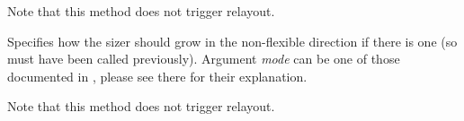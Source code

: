 Note that this method does not trigger relayout.


\label{wxflexgridsizersetnonflexiblegrowmode}


Specifies how the sizer should grow in the non-flexible direction if
there is one (so
 must have
been called previously). Argument {\it mode} can be one of those documented in
, please
see there for their explanation.

Note that this method does not trigger relayout.
